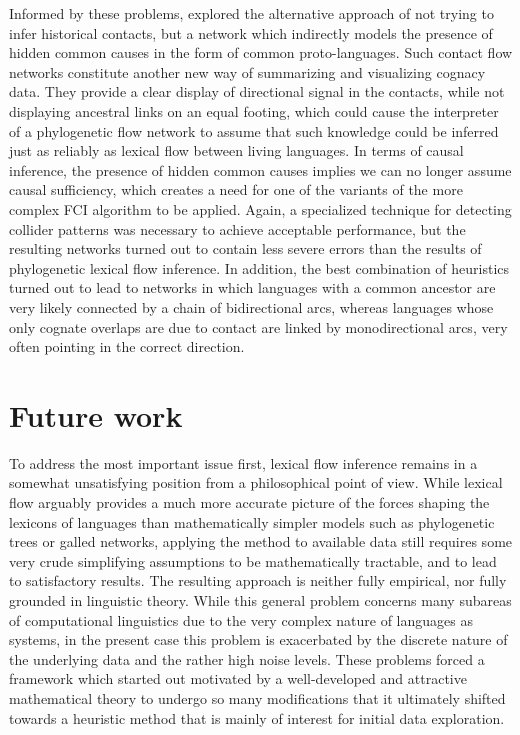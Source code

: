 Informed by these problems,  explored the alternative approach of not trying to infer historical contacts, but a network which indirectly models the presence of hidden common causes in the form of common proto-languages. Such contact flow networks constitute another new way of summarizing and visualizing cognacy data. They provide a clear display of directional signal in the contacts, while not displaying ancestral links on an equal footing, which could cause the interpreter of a phylogenetic flow network to assume that such knowledge could be inferred just as reliably as lexical flow between living languages. In terms of causal inference, the presence of hidden common causes implies we can no longer assume causal sufficiency, which creates a need for one of the variants of the more complex FCI algorithm to be applied. Again, a specialized technique for detecting collider patterns was necessary to achieve acceptable performance, but the resulting networks turned out to contain less severe errors than the 
results of phylogenetic lexical flow inference. In addition, the best combination of heuristics turned out to lead to networks in which languages with a common ancestor are very likely connected by a chain of bidirectional arcs, whereas languages whose only cognate overlaps are due to contact are linked by monodirectional arcs, very often pointing in the correct direction. 

\section{Future work}
To address the most important issue first, lexical flow inference remains in a somewhat unsatisfying position from a philosophical point of view. While lexical flow arguably provides a much more accurate picture of the forces shaping the lexicons of languages than mathematically simpler models such as phylogenetic trees or galled networks, applying the method to available data still requires some very crude simplifying assumptions to be mathematically tractable, and to lead to satisfactory results. The resulting approach is neither fully empirical, nor fully grounded in linguistic theory. While this general problem concerns many subareas of computational linguistics due to the very complex nature of languages as systems, in the present case this problem is exacerbated by the discrete nature of the underlying data and the rather high noise levels. These problems forced a framework which started out motivated by a well-developed and attractive mathematical theory to undergo so many modifications that it ultimately 
shifted towards a heuristic method that is mainly of interest for initial data exploration.

